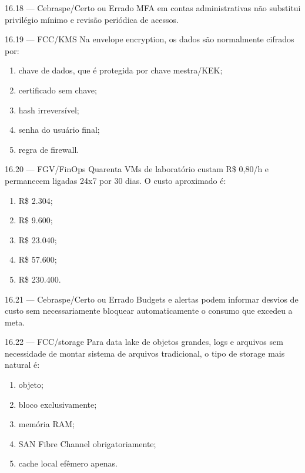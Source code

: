 \begin{questao}{ 16.18 — Cebraspe/Certo ou Errado}
MFA em contas administrativas não substitui privilégio mínimo e revisão periódica de acessos.
\end{questao}

\begin{questao}{ 16.19 — FCC/KMS}
Na envelope encryption, os dados são normalmente cifrados por:
\begin{enumerate}[label=\Alph*)]
\item chave de dados, que é protegida por chave mestra/KEK;
\item certificado sem chave;
\item hash irreversível;
\item senha do usuário final;
\item regra de firewall.
\end{enumerate}
\end{questao}

\begin{questao}{ 16.20 — FGV/FinOps}
Quarenta VMs de laboratório custam R\$ 0,80/h e permanecem ligadas 24x7 por 30 dias. O custo aproximado é:
\begin{enumerate}[label=\Alph*)]
\item R\$ 2.304;
\item R\$ 9.600;
\item R\$ 23.040;
\item R\$ 57.600;
\item R\$ 230.400.
\end{enumerate}
\end{questao}

\begin{questao}{ 16.21 — Cebraspe/Certo ou Errado}
Budgets e alertas podem informar desvios de custo sem necessariamente bloquear automaticamente o consumo que excedeu a meta.
\end{questao}

\begin{questao}{ 16.22 — FCC/storage}
Para data lake de objetos grandes, logs e arquivos sem necessidade de montar sistema de arquivos tradicional, o tipo de storage mais natural é:
\begin{enumerate}[label=\Alph*)]
\item objeto;
\item bloco exclusivamente;
\item memória RAM;
\item SAN Fibre Channel obrigatoriamente;
\item cache local efêmero apenas.
\end{enumerate}
\end{questao}

